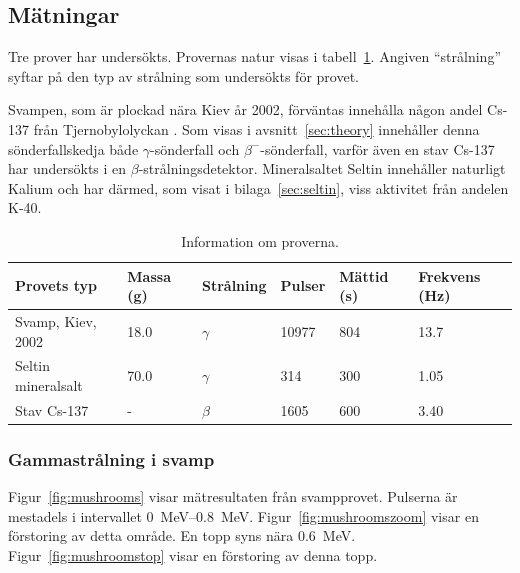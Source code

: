 \subsection{Mätningar} \label{sec:measurements}

Tre prover har undersökts. Provernas natur visas i tabell~\ref{tab:samples}.
Angiven ``strålning'' syftar på den typ av strålning som undersökts för provet.

Svampen, som är plockad nära Kiev år 2002, förväntas innehålla någon andel
Cs-137 från Tjernobylolyckan \parencite{instructions}. Som visas i
avsnitt~\ref{sec:theory} innehåller denna sönderfallskedja både
$\gamma$-sönderfall och $\beta^-$-sönderfall, varför även en stav Cs-137
har undersökts i en $\beta$-strålningsdetektor. Mineralsaltet Seltin innehåller
naturligt Kalium och har därmed, som visat i bilaga~\ref{sec:seltin}, viss
aktivitet från andelen K-40. 

\begin{table}[!ht]
    \begin{tabular}{|l|l|l|l|l|l|}
    \hline
    Provets typ        & Massa (\unit{g}) & Strålning & Pulser      & Mättid (\unit{s}) & Frekvens (\unit{\Hz}) \\
    \hline
    Svamp, Kiev, 2002  & \num{18.0}       & $\gamma$  & \num{10977} & \num{804}         & \num{13.7}            \\
    \hline
    Seltin mineralsalt & \num{70.0}       & $\gamma$  & \num{314}   & \num{300}         & \num{1.05}            \\
    \hline
    Stav Cs-137        & -                & $\beta$   & \num{1605}  & \num{600}         & \num{3.40}            \\
    \hline
    \end{tabular}
    \caption{Information om proverna.}
    \label{tab:samples}
\end{table}

\subsubsection{Gammastrålning i svamp}

Figur~\ref{fig:mushrooms} visar mätresultaten från svampprovet. Pulserna är
mestadels i intervallet \qtyrange{0}{0.8}{\MeV}. Figur~\ref{fig:mushroomszoom}
visar en förstoring av detta område. En topp syns nära \qty{0.6}{\MeV}.
Figur~\ref{fig:mushroomstop} visar en förstoring av denna topp.

